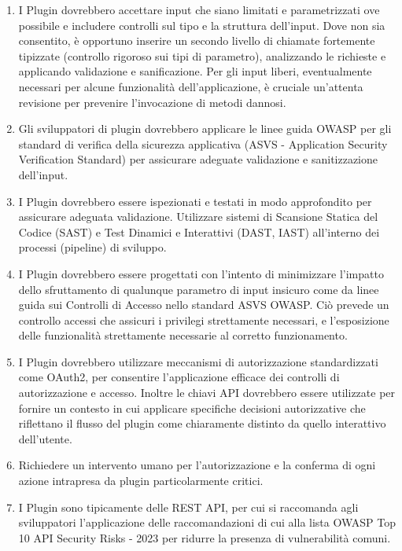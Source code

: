 \documentclass[
]{article}
\providecommand{\tightlist}{%
  \setlength{\itemsep}{0pt}\setlength{\parskip}{0pt}}
\begin{document}
\begin{enumerate}
\def\labelenumi{\arabic{enumi}.}
\tightlist
\item
  I Plugin dovrebbero accettare input che siano limitati e
  parametrizzati ove possibile e includere controlli sul tipo e la
  struttura dell'input. Dove non sia consentito, è opportuno inserire un
  secondo livello di chiamate fortemente tipizzate (controllo rigoroso
  sui tipi di parametro), analizzando le richieste e applicando
  validazione e sanificazione. Per gli input liberi, eventualmente
  necessari per alcune funzionalità dell'applicazione, è cruciale
  un'attenta revisione per prevenire l'invocazione di metodi dannosi.
\item
  Gli sviluppatori di plugin dovrebbero applicare le linee guida OWASP
  per gli standard di verifica della sicurezza applicativa (ASVS -
  Application Security Verification Standard) per assicurare adeguate
  validazione e sanitizzazione dell'input.
\item
  I Plugin dovrebbero essere ispezionati e testati in modo approfondito
  per assicurare adeguata validazione. Utilizzare sistemi di Scansione
  Statica del Codice (SAST) e Test Dinamici e Interattivi (DAST, IAST)
  all'interno dei processi (pipeline) di sviluppo.
\item
  I Plugin dovrebbero essere progettati con l'intento di minimizzare
  l'impatto dello sfruttamento di qualunque parametro di input insicuro
  come da linee guida sui Controlli di Accesso nello standard ASVS
  OWASP. Ciò prevede un controllo accessi che assicuri i privilegi
  strettamente necessari, e l'esposizione delle funzionalità
  strettamente necessarie al corretto funzionamento.
\item
  I Plugin dovrebbero utilizzare meccanismi di autorizzazione
  standardizzati come OAuth2, per consentire l'applicazione efficace dei
  controlli di autorizzazione e accesso. Inoltre le chiavi API
  dovrebbero essere utilizzate per fornire un contesto in cui applicare
  specifiche decisioni autorizzative che riflettano il flusso del plugin
  come chiaramente distinto da quello interattivo dell'utente.
\item
  Richiedere un intervento umano per l'autorizzazione e la conferma di
  ogni azione intrapresa da plugin particolarmente critici.
\item
  I Plugin sono tipicamente delle REST API, per cui si raccomanda agli
  sviluppatori l'applicazione delle raccomandazioni di cui alla lista
  OWASP Top 10 API Security Risks - 2023 per ridurre la presenza di
  vulnerabilità comuni.
\end{enumerate}
\end{document}

